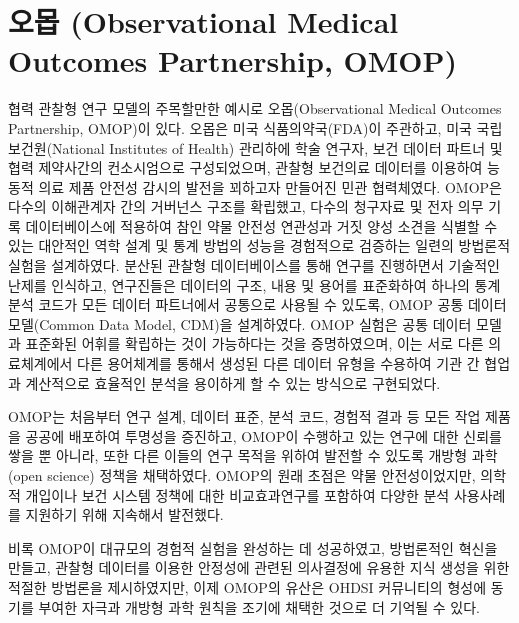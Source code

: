 \documentclass[11pt]{book}
\theoremstyle{definition}
\theoremstyle{definition}
\theoremstyle{definition}
\theoremstyle{remark}
\begin{document}
\section{오몹 (Observational Medical Outcomes Partnership,
OMOP)}\label{-observational-medical-outcomes-partnership-omop}

협력 관찰형 연구 모델의 주목할만한 예시로 오몹(Observational Medical
Outcomes Partnership, OMOP)이 있다. 오몹은 미국 식품의약국(FDA)이
주관하고, 미국 국립 보건원(National Institutes of Health) 관리하에 학술
연구자, 보건 데이터 파트너 및 협력 제약사간의 컨소시엄으로 구성되었으며,
관찰형 보건의료 데이터를 이용하여 능동적 의료 제품 안전성 감시의 발전을
꾀하고자 만들어진 민관 협력체였다. \citep{stang2010omop} OMOP은 다수의
이해관계자 간의 거버넌스 구조를 확립했고, 다수의 청구자료 및 전자 의무
기록 데이터베이스에 적용하여 참인 약물 안전성 연관성과 거짓 양성 소견을
식별할 수 있는 대안적인 역학 설계 및 통계 방법의 성능을 경험적으로
검증하는 일련의 방법론적 실험을 설계하였다. 분산된 관찰형 데이터베이스를
통해 연구를 진행하면서 기술적인 난제를 인식하고, 연구진들은 데이터의
구조, 내용 및 용어를 표준화하여 하나의 통계 분석 코드가 모든 데이터
파트너에서 공통으로 사용될 수 있도록, OMOP 공통 데이터 모델(Common Data
Model, CDM)을 설계하였다. \citep{overhage2012cdm} OMOP 실험은 공통
데이터 모델과 표준화된 어휘를 확립하는 것이 가능하다는 것을
증명하였으며, 이는 서로 다른 의료체계에서 다른 용어체계를 통해서 생성된
다른 데이터 유형을 수용하여 기관 간 협업과 계산적으로 효율적인 분석을
용이하게 할 수 있는 방식으로 구현되었다.

OMOP는 처음부터 연구 설계, 데이터 표준, 분석 코드, 경험적 결과 등 모든
작업 제품을 공공에 배포하여 투명성을 증진하고, OMOP이 수행하고 있는
연구에 대한 신뢰를 쌓을 뿐 아니라, 또한 다른 이들의 연구 목적을 위하여
발전할 수 있도록 개방형 과학(open science) 정책을 채택하였다. OMOP의
원래 초점은 약물 안전성이었지만, 의학적 개입이나 보건 시스템 정책에 대한
비교효과연구를 포함하여 다양한 분석 사용사례를 지원하기 위해 지속해서
발전했다.

비록 OMOP이 대규모의 경험적 실험을 완성하는 데 성공하였고,
\citep{ryan2012omop, ryan2013omop} 방법론적인 혁신을 만들고,
\citep{schuemie_2014} 관찰형 데이터를 이용한 안정성에 관련된 의사결정에
유용한 지식 생성을 위한 적절한 방법론을 제시하였지만,
\citep{madigan_2013, madigan2013design} 이제 OMOP의 유산은 OHDSI
커뮤니티의 형성에 동기를 부여한 자극과 개방형 과학 원칙을 조기에 채택한
것으로 더 기억될 수 있다.
\end{document}
